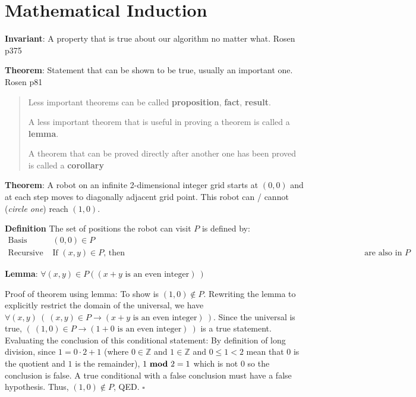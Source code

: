\documentclass[12pt, oneside]{article}
\begin{document}

\section*{Mathematical Induction}


{\bf Invariant}: A property that is true about our algorithm no matter what. \hfill Rosen p375

{\bf Theorem}: Statement that can be shown to be true, usually an important one. \hfill Rosen p81

\begin{quote}
 Less important theorems can be called {\bf proposition}, {\bf fact}, {\bf result}.

 A less important theorem that is useful in proving a theorem is called a {\bf lemma}.
 
 A theorem that can be proved directly after another one has been proved is called a {\bf corollary}
\end{quote}







{\bf Theorem}: A robot on an infinite 2-dimensional integer grid starts at $(0,0)$ and at each step moves
to diagonally adjacent grid point. This robot can / cannot {\footnotesize({\it circle one})} reach $(1,0)$.


{\bf Definition} The set of positions the robot can visit  $P$ is defined by:
\[
\begin{array}{ll}
    \textrm{Basis Step: } & (0,0) \in P \\
    \textrm{Recursive Step: } & \textrm{If } (x,y) \in P  \textrm{, then } 
    \phantom{(x+1, y+1), (x+1, y-1), (x-1, y-1), (x-1, y+1)} \textrm{ are also in } P
\end{array}
\]

{\bf Lemma}: $\forall (x,y) \in P( (x+y \textrm{ is an even integer})~)$


Proof of theorem using lemma: To show is $(1,0) \notin P$. Rewriting the lemma to explicitly 
restrict the domain of the universal, 
we have $\forall (x,y) ~(~ (x,y) \in P  \to (x+y \textrm{ is an even integer})~)$.  Since
the universal is true, 
$ (~ (1,0) \in P \to (1+0 \textrm{ is an even integer})~)$ is a true statement.
Evaluating the conclusion of this conditional statement: 
By definition of long division, since $1 = 0 \cdot 2 + 1$ (where $0 \in \mathbb{Z}$ and 
$1 \in \mathbb{Z}$ and $0 \leq 1 < 2$ mean that $0$ is the quotient and $1$ is the remainder), $1 ~\textrm{\bf mod}~ 2 = 1$ which is not $0$ 
so the conclusion is false.  A true conditional with a false conclusion must have a false hypothesis.
Thus, $(1,0) \notin P$, QED. $\square$
\end{document}
